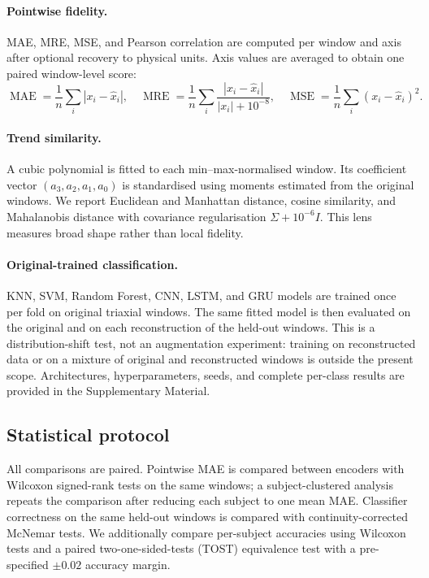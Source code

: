 \documentclass[10pt,a4paper,parskip=half-]{scrartcl}
\begin{document}
\paragraph{Pointwise fidelity.}
MAE, MRE, MSE, and Pearson correlation are computed per window and axis after optional recovery to physical units. Axis values are averaged to obtain one paired window-level score:
\[
\operatorname{MAE}=\frac1n\sum_i|x_i-\hat x_i|,
\quad
\operatorname{MRE}=\frac1n\sum_i\frac{|x_i-\hat x_i|}{|x_i|+10^{-8}},
\quad
\operatorname{MSE}=\frac1n\sum_i(x_i-\hat x_i)^2.

\]

\paragraph{Trend similarity.}
\label{sec:polynomial_trend_metrics}
A cubic polynomial is fitted to each min--max-normalised window. Its coefficient vector \((a_3,a_2,a_1,a_0)\) is standardised using moments estimated from the original windows. We report Euclidean and Manhattan distance, cosine similarity, and Mahalanobis distance with covariance regularisation \(\Sigma+10^{-6}I\). This lens measures broad shape rather than local fidelity.

\paragraph{Original-trained classification.}
KNN, SVM, Random Forest, CNN, LSTM, and GRU models are trained once per fold on original triaxial windows. The same fitted model is then evaluated on the original and on each reconstruction of the held-out windows. This is a distribution-shift test, not an augmentation experiment: training on reconstructed data or on a mixture of original and reconstructed windows is outside the present scope. Architectures, hyperparameters, seeds, and complete per-class results are provided in the Supplementary Material.

\subsection{Statistical protocol}
\label{sec:statistical_protocol}

All comparisons are paired. Pointwise MAE is compared between encoders with Wilcoxon signed-rank tests on the same windows; a subject-clustered analysis repeats the comparison after reducing each subject to one mean MAE. Classifier correctness on the same held-out windows is compared with continuity-corrected McNemar tests. We additionally compare per-subject accuracies using Wilcoxon tests and a paired two-one-sided-tests (TOST) equivalence test with a pre-specified \(\pm0.02\) accuracy margin.
\end{document}
